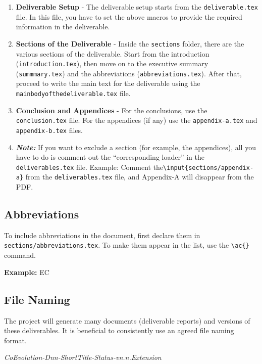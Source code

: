 \begin{enumerate}
    \item \textbf{Deliverable Setup} -  The deliverable setup starts from the \texttt{deliverable.tex} file. In this file, you have to set the above macros to provide the required information in the deliverable.
    \item \textbf{Sections of the Deliverable} - Inside the \texttt{sections} folder, there are the various sections of the deliverable. Start from the introduction (\texttt{introduction.tex}), then move on to the executive summary (\texttt{summmary.tex}) and the abbreviations (\texttt{abbreviations.tex}). After that, proceed to write the main text for the deliverable using the \texttt{mainbodyofthedeliverable.tex} file. 
    \item \textbf{Conclusion and Appendices} -  For the conclusions, use the \texttt{conclusion.tex} file. For the appendices (if any) use the \texttt{appendix-a.tex} and \texttt{appendix-b.tex} files.
    \item \textbf{\textit{Note:}} If you want to exclude a section (for example, the appendices), all you have to do is comment out the ``corresponding loader'' in the \texttt{deliverables.tex} file. Example: Comment the\texttt{\textbackslash input\{sections/appendix-a\}} from the \texttt{deliverables.tex} file, and Appendix-A will disappear from the PDF.
\end{enumerate}


\subsection{Abbreviations}
\label{sec:report-titles}


To include abbreviations in the document, first declare them in \texttt{sections/abbreviations.tex}. To make them appear in the list, use the \texttt{\textbackslash ac\{\}} command.

\textbf{Example:} \ac{EC}


\subsection{File Naming}
\label{sec:file-naming}

The project will generate many documents (deliverable reports) and versions of these deliverables. It is beneficial to consistently use an agreed file naming format. 

\textit{CoEvolution-Dnn-ShortTitle-Status-vn.n.Extension}

